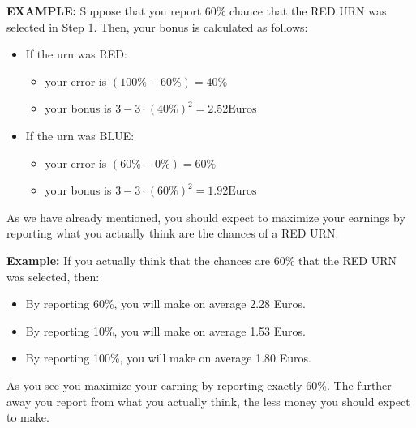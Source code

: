 \noindent\textbf{EXAMPLE:} Suppose that you report 60\% chance that the RED URN was selected in Step 1. Then, your bonus is calculated as follows: 
\begin{itemize}
    \item If the urn was RED:
    \begin{itemize}
        \item your error is $(100\%-60\%) = 40\%$
        \item your bonus is $3-3\cdot (40\%)^2 = 2.52 \text{Euros}$
    \end{itemize}
    \item If the urn was BLUE:
    \begin{itemize}
        \item your error is $(60\%-0\%) = 60\%$
        \item your bonus is $3-3\cdot (60\%)^2 = 1.92 \text{Euros}$
    \end{itemize}
\end{itemize}

\noindent As we have already mentioned, you should expect to maximize your earnings by reporting what you actually think are the chances of a RED URN. 

\noindent \textbf{Example:} If you actually think that the chances are 60\% that the RED URN was selected, then:
\begin{itemize}
    \item By reporting 60\%, you will make on average 2.28 Euros.
    \item By reporting 10\%, you will make on average 1.53 Euros.
    \item By reporting 100\%, you will make on average 1.80 Euros.
\end{itemize}

\noindent As you see you maximize your earning by reporting exactly 60\%. The further away you report from what you actually think, the less money you should expect to make.


